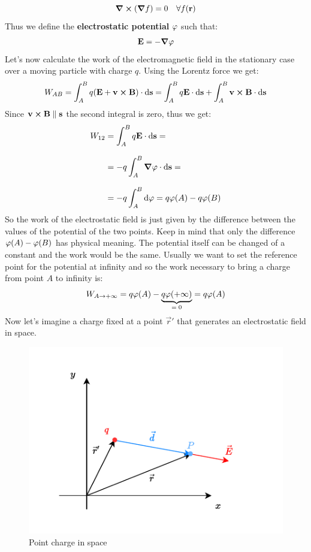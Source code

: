 \begin{equation}
  \curl{(\grad{f})} = 0 \quad \forall f(\vb{r})
\end{equation}
Thus we define the \textbf{electrostatic potential} $\varphi$ such that:
\begin{equation}
  \vb{E} = -\grad{\varphi}
\end{equation}
Let's now calculate the work of the electromagnetic field in the stationary case over a moving particle with charge $q$. Using the Lorentz force we get:
\begin{equation}
  W_{AB} = \int_{A}^{B} q (\vb{E} + \vb{v} \cross \vb{B}) \cdot \dd{\vb{s}} = \int_{A}^{B} q \vb{E} \cdot \dd{\vb{s}} + \int_{A}^{B} \vb{v} \cross \vb{B} \cdot \dd{\vb{s}}
\end{equation}
Since $\vb{v} \cross \vb{B} \parallel \vb{s}$ the second integral is zero, thus we get:
\begin{equation}
  \begin{split}
    W_{12} &= \int_{A}^{B} q \vb{E} \cdot \dd{\vb{s}} =\\[8pt]
    &= -q \int_{A}^{B} \grad{\varphi} \cdot \dd{\vb{s}} =\\[8pt]
    &= -q \int_{A}^{B} \dd{\varphi} = q\varphi(A) - q\varphi(B)
  \end{split}
\end{equation}
So the work of the electrostatic field is just given by the difference between the values of the potential of the two points. Keep in mind that only the difference $\varphi(A) - \varphi(B)$ has physical meaning. The potential itself can be changed of a constant and the work would be the same. Usually we want to set the reference point for the potential at infinity and so the work necessary to bring a charge from point $A$ to infinity is:
\begin{equation}
  W_{A\rightarrow +\infty} = q\varphi(A) - \underbrace{q\varphi(+\infty)}_{=\;0} = q\varphi(A)
\end{equation}
Now let's imagine a charge fixed at a point $\vec{r}'$ that generates an electrostatic field in space.
\begin{figure}[H]
  \centering
  \includegraphics[width=0.7\linewidth]{res/svg/point_charge.drawio}
  \caption{Point charge in space}
\end{figure}
